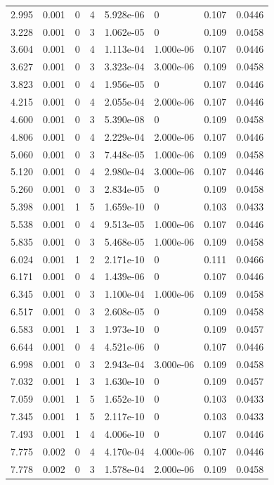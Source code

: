 \documentclass[preview]{standalone}
\begin{document}
{{\begin{tabular}{L{1.2cm}C{1.2cm} C{0.3cm}C{0.5cm} C{1.4cm}C{1.4cm} C{1.4cm}C{1.4cm}}
  2.995  &  0.001  & 0     &  4 &  5.928e-06  & 0  & 0.107 &  0.0446   \\ 
  3.228  &  0.001  & 0     &  3 &  1.062e-05  & 0  & 0.109 &  0.0458   \\ 
  3.604  &  0.001  & 0     &  4 &  1.113e-04  & 1.000e-06  & 0.107 &  0.0446   \\ 
  3.627  &  0.001  & 0     &  3 &  3.323e-04  & 3.000e-06  & 0.109 &  0.0458   \\ 
  3.823  &  0.001  & 0     &  4 &  1.956e-05  & 0  & 0.107 &  0.0446   \\ 
  4.215  &  0.001  & 0     &  4 &  2.055e-04  & 2.000e-06  & 0.107 &  0.0446   \\ 
  4.600  &  0.001  & 0     &  3 &  5.390e-08  & 0  & 0.109 &  0.0458   \\ 
  4.806  &  0.001  & 0     &  4 &  2.229e-04  & 2.000e-06  & 0.107 &  0.0446   \\ 
  5.060  &  0.001  & 0     &  3 &  7.448e-05  & 1.000e-06  & 0.109 &  0.0458   \\ 
  5.120  &  0.001  & 0     &  4 &  2.980e-04  & 3.000e-06  & 0.107 &  0.0446   \\ 
  5.260  &  0.001  & 0     &  3 &  2.834e-05  & 0  & 0.109 &  0.0458   \\ 
  5.398  &  0.001  & 1     &  5 &  1.659e-10  & 0  & 0.103 &  0.0433   \\ 
  5.538  &  0.001  & 0     &  4 &  9.513e-05  & 1.000e-06  & 0.107 &  0.0446   \\ 
  5.835  &  0.001  & 0     &  3 &  5.468e-05  & 1.000e-06  & 0.109 &  0.0458   \\ 
  6.024  &  0.001  & 1     &  2 &  2.171e-10  & 0  & 0.111 &  0.0466   \\ 
  6.171  &  0.001  & 0     &  4 &  1.439e-06  & 0  & 0.107 &  0.0446   \\ 
  6.345  &  0.001  & 0     &  3 &  1.100e-04  & 1.000e-06  & 0.109 &  0.0458   \\ 
  6.517  &  0.001  & 0     &  3 &  2.608e-05  & 0  & 0.109 &  0.0458   \\ 
  6.583  &  0.001  & 1     &  3 &  1.973e-10  & 0  & 0.109 &  0.0457   \\ 
  6.644  &  0.001  & 0     &  4 &  4.521e-06  & 0  & 0.107 &  0.0446   \\ 
  6.998  &  0.001  & 0     &  3 &  2.943e-04  & 3.000e-06  & 0.109 &  0.0458   \\ 
  7.032  &  0.001  & 1     &  3 &  1.630e-10  & 0  & 0.109 &  0.0457   \\ 
  7.059  &  0.001  & 1     &  5 &  1.652e-10  & 0  & 0.103 &  0.0433   \\ 
  7.345  &  0.001  & 1     &  5 &  2.117e-10  & 0  & 0.103 &  0.0433   \\ 
  7.493  &  0.001  & 1     &  4 &  4.006e-10  & 0  & 0.107 &  0.0446   \\ 
  7.775  &  0.002  & 0     &  4 &  4.170e-04  & 4.000e-06  & 0.107 &  0.0446   \\ 
  7.778  &  0.002  & 0     &  3 &  1.578e-04  & 2.000e-06  & 0.109 &  0.0458   \\ 
\hline 
\end{tabular} 

}}
\end{document}
